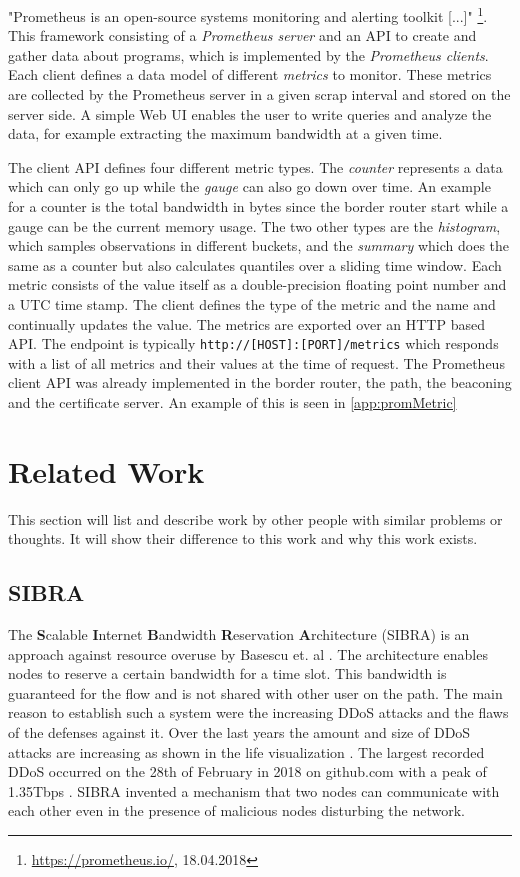 \documentclass[thesis.tex]{subfiles}
\begin{document}
"Prometheus is an open-source systems monitoring and alerting toolkit [...]" \footnote{\url{https://prometheus.io/}, 18.04.2018}. This framework consisting of a \textit{Prometheus server} and an API to create and gather data about programs, which is implemented by the \textit{Prometheus clients}. Each client defines a data model of different \textit{metrics} to monitor. These metrics are collected by the Prometheus server in a given scrap interval and stored on the server side. A simple Web UI enables the user to write queries and analyze the data, for example extracting the maximum bandwidth at a given time.

The client API defines four different metric types. The \textit{counter} represents a data which can only go up while the \textit{gauge} can also go down over time. An example for a counter is the total bandwidth in bytes since the border router start while a gauge can be the current memory usage. The two other types are the \textit{histogram}, which samples observations in different buckets, and the \textit{summary} which does the same as a counter but also calculates quantiles over a sliding time window. Each metric consists of the value itself as a double-precision floating point number and a UTC time stamp. The client defines the type of the metric and the name and continually updates the value. The metrics are exported over an HTTP based API. The endpoint is typically {\lstinline|http://[HOST]:[PORT]/metrics|} which responds with a list of all metrics and their values at the time of request. The Prometheus client API was already implemented in the border router, the path, the beaconing and the certificate server. An example of this is seen in \autoref{app:promMetric}

\section{Related Work}\label{chap:prevwork}

This section will list and describe work by other people with similar problems or thoughts. It will show their difference to this work and why this work exists.

\subsection{SIBRA} \label{sec:prevwork:sibra}

The \textbf{S}calable \textbf{I}nternet \textbf{B}andwidth \textbf{R}eservation \textbf{A}rchitecture (SIBRA) is an approach against resource overuse by Basescu et. al \cite{Basescu.2016}. The architecture enables nodes to reserve a certain bandwidth for a time slot. This bandwidth is guaranteed for the flow and is not shared with other user on the path. The main reason to establish such a system were the increasing DDoS attacks and the flaws of the defenses against it. Over the last years the amount and size of DDoS attacks are increasing as shown in the life visualization \cite{GoogleInc.2013}. The largest recorded DDoS occurred on the 28th of February in 2018 on github.com with a peak of 1.35Tbps \cite{Kottler.01.03.2018}. SIBRA invented a mechanism that two nodes can communicate with each other even in the presence of malicious nodes disturbing the network.
\end{document}

